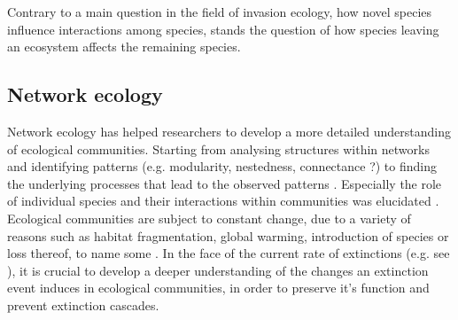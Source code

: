 \documentclass[12pt,a4paper]{article}
\begin{document}
Contrary to a main question in the field of invasion ecology, how novel species influence interactions among species, stands the question of how species leaving an ecosystem affects the remaining species. 


%
\subsection{Network ecology}
Network ecology has helped researchers to develop a more detailed understanding of ecological communities. Starting from analysing structures within networks and identifying patterns (e.g. modularity, nestedness, connectance ?) \parencite{Jordano1987, Dunne2002 } %
to finding the underlying processes that lead to the observed patterns \parencite{Rezende2007, Vazquez2009, Thebault2010}. Especially the role of individual species and their interactions within communities was elucidated \parencite{Waser1996, Lau2017}.
Ecological communities are subject to constant change, due to a variety of reasons such as habitat fragmentation, global warming, introduction of species or loss thereof, to name some \parencite{}. In the face of the current rate of extinctions (e.g. see \cite{IPBES}), it is crucial to develop a deeper understanding of the changes an extinction event induces in ecological communities, in order to preserve it's function and prevent extinction cascades. 

	

\end{document}
